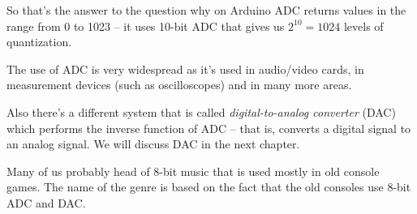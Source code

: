 \documentclass[../sparc.tex]{subfiles}
\begin{document}
So that's the answer to the question why on Arduino ADC returns values in the
range from 0 to 1023 -- it uses 10-bit ADC that gives us $2^{10} = 1024$ levels
of quantization.

The use of ADC is very widespread as it's used in audio/video cards, in
measurement devices (such as oscilloscopes) and in many more areas.

Also there's a different system that is called \emph{digital-to-analog
converter} (DAC) which performs the inverse function of ADC -- that is, converts
a digital signal to an analog signal.  We will discuss DAC in the next chapter.

Many of us probably head of 8-bit music that is used mostly in old console
games.  The name of the genre is based on the fact that the old consoles use
8-bit ADC and DAC.

\end{document}
